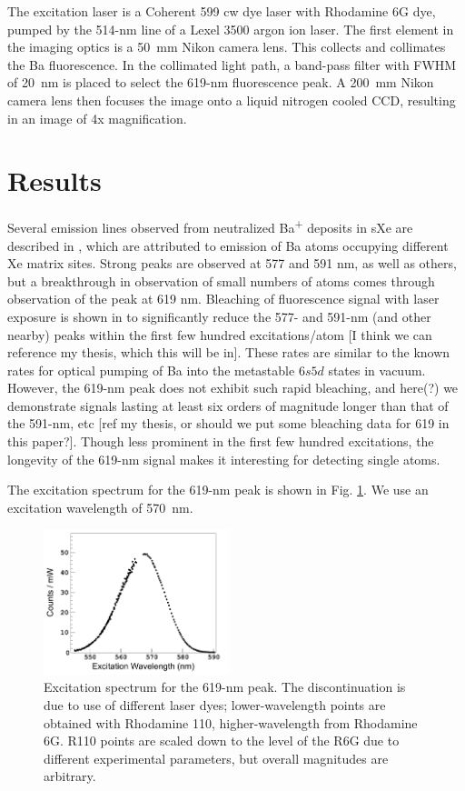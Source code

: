 \documentclass[aps,pra,reprint,superscriptaddress]{revtex4-1}
\begin{document}
The excitation laser is a Coherent 599 cw dye laser with Rhodamine 6G dye, pumped by the 514-nm line of a Lexel 3500 argon ion laser.  The first element in the imaging optics is a 50~mm Nikon camera lens.  This collects and collimates the Ba fluorescence.  In the collimated light path, a band-pass filter with FWHM of 20~nm is placed to select the 619-nm fluorescence peak.  A 200~mm Nikon camera lens then focuses the image onto a liquid nitrogen cooled CCD, resulting in an image of 4x magnification.

\section{Results}
\label{sec:results}

Several emission lines observed from neutralized Ba\textsuperscript{+} deposits in sXe are described in \cite{Mong2015}, which are attributed to emission of Ba atoms occupying different Xe matrix sites.  Strong peaks are observed at 577 and 591 nm, as well as others, but a breakthrough in observation of small numbers of atoms comes through observation of the peak at 619 nm.  Bleaching of fluorescence signal with laser exposure is shown in \cite{Mong2015} to significantly reduce the 577- and 591-nm (and other nearby) peaks within the first few hundred excitations/atom {\color{red}[I think we can reference my thesis, which this will be in]}.  These rates are similar to the known rates for optical pumping of Ba into the metastable $6s5d$ states in vacuum.  However, the 619-nm peak does not exhibit such rapid bleaching, and here(?) we demonstrate signals lasting at least six orders of magnitude longer than that of the 591-nm, etc {\color{red}[ref my thesis, or should we put some bleaching data for 619 in this paper?]}.  Though less prominent in the first few hundred excitations, the longevity of the 619-nm signal makes it interesting for detecting single atoms.

The excitation spectrum for the 619-nm peak is shown in Fig. \ref{fig:excitspec}.  We use an excitation wavelength of 570~nm.

\begin{figure}
\includegraphics[width=0.48\textwidth]{figures/excitspec.png}
\caption{Excitation spectrum for the 619-nm peak.  The discontinuation is due to use of different laser dyes; lower-wavelength points are obtained with Rhodamine 110, higher-wavelength from Rhodamine 6G.  R110 points are scaled down to the level of the R6G due to different experimental parameters, but overall magnitudes are arbitrary.}
\label{fig:excitspec}
\end{figure}
\end{document}
